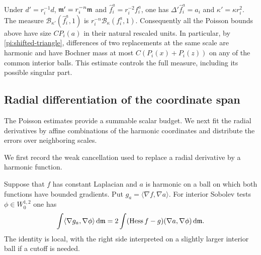 \begin{remark}
\label{pi:poisson-units}
Under $d'=r_i^{-1}d$, $\mathfrak m'=r_i^{-n}\mathfrak m$ and
$\widehat f_i^a=r_i^{-2}f_i^a$, one has
$\Delta'\widehat f_i^a=a_i$ and $\kappa'=\kappa r_i^2$.
The measure $\mathcal B_{\kappa'}(\widehat f_i^a,1)$ is
$r_i^{-n}\mathcal B_\kappa(f_i^a,1)$.  Consequently all the
Poisson bounds above have size $CP_i(a)$ in their natural rescaled
units.  In particular, by \eqref{pi:shifted-triangle}, differences
of two replacements at the same scale are harmonic and have
Bochner mass at most $C(P_i(x)+P_i(z))$ on any of the common
interior balls.  This estimate controls the full measure, including
its possible singular part.
\end{remark}

\subsection{Radial differentiation of the coordinate span}

The Poisson estimates provide a summable scalar budget. We next
fit the radial derivatives by affine combinations of the harmonic
coordinates and distribute the errors over neighboring scales.

We first record the weak cancellation used to replace a radial
derivative by a harmonic function.

\begin{lemma}
\label{pi:weak-cancellation}
Suppose that $f$ has constant Laplacian and $a$ is harmonic on a
ball on which both functions have bounded gradients.  Put
$g_a=\langle\nabla f,\nabla a\rangle$.  For interior Sobolev tests
$\phi\in W^{1,2}_0$ one has
\begin{equation}
 \int\langle\nabla g_a,\nabla\phi\rangle\,\mathrm d\mathfrak m
 =2\int(\operatorname{Hess} f-g)(\nabla a,\nabla\phi)\,\mathrm d\mathfrak m.
 \label{pi:weak-cancellation-equation}
\end{equation}
The identity is local, with the right side interpreted on a
slightly larger interior ball if a cutoff is needed.
\end{lemma}

